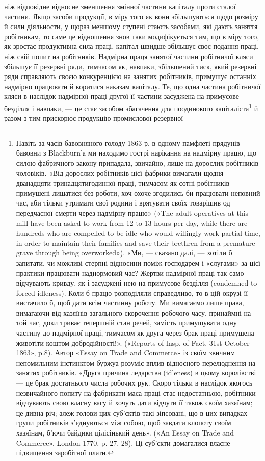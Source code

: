 ніж відповідне відносне зменшення змінної частини капіталу
проти сталої частини. Якщо засоби продукції, в міру того як
вони збільшуються щодо розміру й сили діяльности, у щораз
меншому ступені стають засобами, які дають заняття робітникам,
то саме це відношення знов таки модифікується тим, що в міру
того, як зростає продуктивна сила праці, капітал швидше збільшує
своє подання праці, ніж свій попит на робітників. Надмірна
праця занятої частини робітничої кляси збільшує її резервні
ряди, тимчасом як, навпаки, збільшений тиск, який резервні
ряди справляють своєю конкуренцією на занятих робітників,
примушує останніх надмірно працювати й коритися наказам
капіталу. Те, що одна частина робітничої кляси в наслідок надмірної
праці другої її частини засуджена на примусове безділля
і навпаки, — це стає засобом збагачення для поодинокого капіталіста\footnote{
Навіть за часів бавовняного голоду 1863 р. в одному памфлеті
прядунів бавовни з Blackburn’а ми находимо гострі нарікання на надмірну
працю, що силою фабричного закону припадала, звичайно, лише
на дорослих робітників-чоловіків. «Від дорослих робітників цієї фабрики
вимагали щодня дванадцяти-тринадцятигодинної праці, тимчасом
як сотні робітників примушені лишатися без роботи, хоч охоче згодились
би працювати неповний час, аби тільки утримати свої родини і врятувати
своїх товарішив од передчасної смерти через надмірну працю» («The
adult operatives at this mill have been asked to work from 12 to 13 hours
per day, while there are hundreds who are compelled to be idle who would
willingly work partial time, in order to maintain their families and save
their brethren from a premature grave through being overworked»). «Ми, —
сказано далі, — хотіли б запитати, чи можливі стерпні відносини поміж
господарем і «слугами» за цієї практики працювати наднормовий час?
Жертви надмірної праці так само відчувають кривду, як і засуджені
нею на примусове безділля (condemned to forced idleness). Коли б працю
розподіляли справедливо, то в цій окрузі її вистачило б, щоб дати всім
частинну роботу. Ми вимагаємо лише права, вимагаючи від хазяїнів загального
скорочення робочого часу, принаймні на той час, доки триває
тепершній стан речей, замість примушувати одну частину до надмірної
праці, тимчасом як друга через брак праці примушена животіти коштом
добродійності!». («Reports of lnsp. of Fact. 31st October 1863», p.8).
Автор «Essay on Trade and Commerce» із своїм звичним непомильним
інстинктом буржуа розуміє вплив відносного перелюднення на занятих
робітників. «Друга причина ледарства (idleness) в цьому королівстві —
це брак достатнього числа робочих рук. Скоро тільки в наслідок якогось
незвичайного попиту на фабрикати маса праці стає недостатньою, робітники
відчувають свою власну вагу й хочуть дати відчути її також своїм
хазяїнам; це дивна річ; алеж голови цих суб’єктів такі зіпсовані, що в цих
випадках групи робітників з’єднуються між собою, щоб завдати клопоту
своїм хазяїнам, б’ючи байдики цілісінький день». («An Essay on Trade
and Commerce», London 1770, p. 27, 28). Ці суб’єкти домагалися власне
підвищення заробітної плати.
} й разом з тим прискорює продукцію промислової резервної
